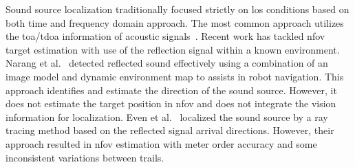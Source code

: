 \documentclass[letterpaper, 10 pt, conference]{ieeeconf}  %
\begin{document}
Sound source localization traditionally focused strictly on \gls{los} conditions based on both time and frequency domain approach. The most common approach utilizes the \acrfull{toa}/\acrfull{tdoa} information of acoustic signals~\cite{hu2011simultaneous,ward2003particle,Mak2009}. Recent work has tackled \acrfull{nfov} target estimation with use of the reflection signal within a known environment. Narang et al.~\cite{narang2014auditory} detected reflected sound effectively using a combination of an image model and dynamic environment map to assists in robot navigation. This approach identifies and estimate the direction of the sound source. However, it does not estimate the target position in \gls{nfov} and does not integrate the vision information for localization. Even et al.~\cite{even2014audio} localized the sound source by a ray tracing method based on the reflected signal arrival directions. However, their approach resulted in \gls{nfov} estimation with meter order accuracy and some inconsistent variations between trails.
%
\end{document}
